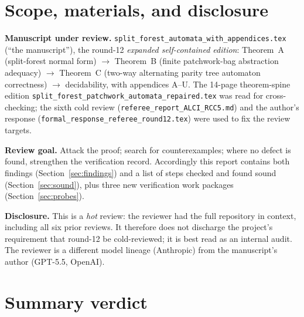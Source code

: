\documentclass[11pt]{article}
\theoremstyle{definition}
\newcommand{\code}[1]{\texttt{#1}}
\begin{document}
\section{Scope, materials, and disclosure}

\textbf{Manuscript under review.}
\code{split\_forest\_automata\_with\_appendices.tex} (``the manuscript''),
the round-12 \emph{expanded self-contained edition}: Theorem~A (split-forest
normal form) $\to$ Theorem~B (finite patchwork-bag abstraction adequacy)
$\to$ Theorem~C (two-way alternating parity tree automaton correctness)
$\to$ decidability, with appendices A--U.  The 14-page theorem-spine
edition \code{split\_forest\_patchwork\_automata\_repaired.tex} was read for
cross-checking; the sixth cold review
(\code{referee\_report\_ALCI\_RCC5.md}) and the author's response
(\code{formal\_response\_referee\_round12.tex}) were used to fix the review
targets.

\textbf{Review goal.}  Attack the proof; search for counterexamples; where
no defect is found, strengthen the verification record.  Accordingly this
report contains both findings (Section~\ref{sec:findings}) and a list of
steps checked and found sound (Section~\ref{sec:sound}), plus three new
verification work packages (Section~\ref{sec:probes}).

\textbf{Disclosure.}  This is a \emph{hot} review: the reviewer had the full
repository in context, including all six prior reviews.  It therefore does
not discharge the project's requirement that round-12 be cold-reviewed; it
is best read as an internal audit.  The reviewer is a different model
lineage (Anthropic) from the manuscript's author (GPT-5.5, OpenAI).

\section{Summary verdict}\label{sec:verdict}
\end{document}
